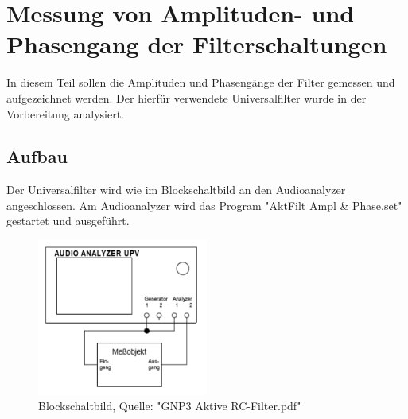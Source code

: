 \section{ Messung von Amplituden- und Phasengang der Filterschaltungen }
In diesem Teil sollen die Amplituden und Phasengänge der Filter gemessen und aufgezeichnet werden.
Der hierfür verwendete Universalfilter wurde in der Vorbereitung analysiert.


\subsection*{Aufbau}
Der Universalfilter wird wie im Blockschaltbild an den Audioanalyzer angeschlossen.
Am Audioanalyzer wird das Program "AktFilt Ampl & Phase.set" gestartet und ausgeführt.

\begin{figure}[H]
    \begin{center}
        \includegraphics[width=0.5\textwidth]{img/Blockschalt.PNG}
        \caption{Blockschaltbild, Quelle: "GNP3 Aktive RC-Filter.pdf" }
        \label{fig:A3_label}
    \end{center}
\end{figure}






